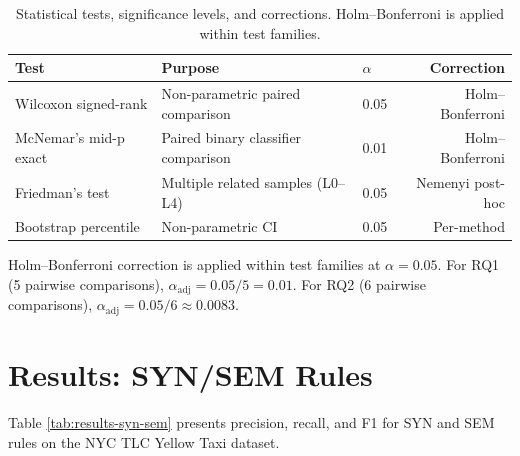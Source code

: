 \begin{table}[htbp]
  \centering
  \caption{Statistical tests, significance levels, and corrections.
    Holm--Bonferroni is applied within test families.}
  \label{tab:statistical-tests}
  \begin{tabular}{lllr}
    \toprule
    Test & Purpose & $\alpha$ & Correction \\
    \midrule
    Wilcoxon signed-rank & Non-parametric paired comparison & 0.05 & Holm--Bonferroni \\
    McNemar's mid-p exact & Paired binary classifier comparison & 0.01 & Holm--Bonferroni \\
    Friedman's test & Multiple related samples (L0--L4) & 0.05 & Nemenyi post-hoc \\
    Bootstrap percentile & Non-parametric CI & 0.05 & Per-method \\
    \bottomrule
  \end{tabular}
\end{table}

Holm--Bonferroni correction is applied within test families at $\alpha = 0.05$.
For RQ1 (5 pairwise comparisons), $\alpha_{\text{adj}} = 0.05 / 5 = 0.01$.
For RQ2 (6 pairwise comparisons), $\alpha_{\text{adj}} = 0.05 / 6 \approx 0.0083$.

\section{Results: SYN/SEM Rules}
\label{sec:results-syn-sem}

Table \ref{tab:results-syn-sem} presents precision, recall, and F1 for SYN
and SEM rules on the NYC TLC Yellow Taxi dataset.

